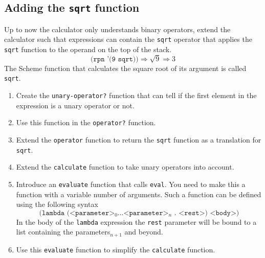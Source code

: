 \documentclass[12pt,a4paper,english,twoside]{article}
\begin{document}
\subsection{Adding the \texttt{sqrt} function}
Up to now the calculator only understands binary operators, extend the 
calculator such that expressions can contain the \texttt{sqrt} operator that 
applies the \texttt{sqrt} function to the operand on the top of the stack.  
\begin{equation*}
  \texttt{(rpn '(9 sqrt))} \Rightarrow \sqrt{9} \Rightarrow 3
\end{equation*}
The Scheme function that calculates the square root of its argument is called 
\texttt{sqrt}.
\begin{enumerate}
  \item Create the \texttt{unary-operator?} function that can tell if the 
    first element in the expression is a unary operator or not. 
  \item Use this function in the \texttt{operator?} function.
  \item Extend the \texttt{operator} function to return the \texttt{sqrt} 
    function as a translation for \texttt{sqrt}.
  \item Extend the \texttt{calculate} function to take unary operators into 
    account.
  \item Introduce an \texttt{evaluate} function that calls \texttt{eval}. You 
    need to make this a function with a variable number of arguments. Such a 
    function can be defined using the following syntax
    \begin{equation*}
      \texttt{(lambda (<parameter>$_{0} \dots $<parameter>$_{n}$ . <rest>) <body>)}
    \end{equation*}
    In the body of the \texttt{lambda} expression the \texttt{rest} parameter 
    will be bound to a list containing the parameters$_{n+1}$ and beyond.
  \item Use this \texttt{evaluate} function to simplify the \texttt{calculate} 
    function.
\end{enumerate}
\end{document}
